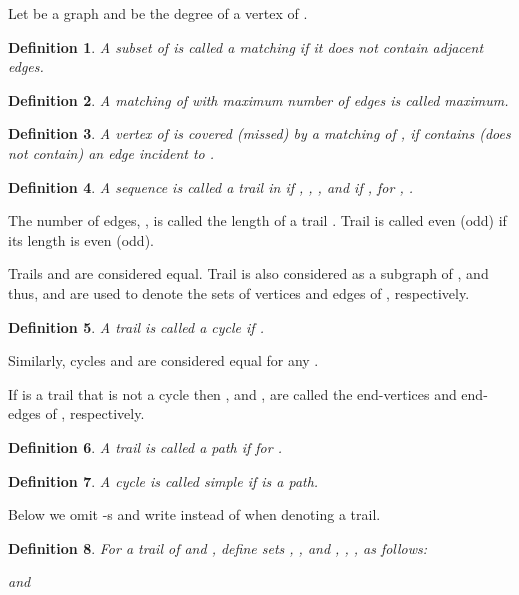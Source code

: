 \documentclass[a4paper, 12pt]{article}
\newtheorem{definition}{Definition}[section]
\begin{document}
Let  be a graph and  be the degree of a vertex  of
.

\begin{definition}\label{matching_definition}
A subset of  is called a matching if it does not contain
adjacent edges.
\end{definition}

\begin{definition}\label{maximum_matching_definition}
A matching of  with maximum number of edges is called maximum.
\end{definition}

\begin{definition}\label{covered_missed_by_matching}
A vertex  of  is covered (missed) by a matching  of , if
 contains (does not contain) an edge incident to .
\end{definition}

\begin{definition}\label{trail_definition}
A sequence  is called a trail
in  if , , ,
and  if , for , .
\end{definition}

The number of edges, , is called the length of a trail . Trail is called even (odd) if its
length is even (odd).

Trails  and  are considered equal. Trail  is also
considered as a subgraph of , and thus,  and  are
used to denote the sets of vertices and edges of , respectively.

\begin{definition}\label{cycle_definition}
A trail  is called a cycle if
.
\end{definition}

Similarly, cycles  and  are considered equal for
any .

If  is a trail that is
not a cycle then ,  and ,  are called the
end-vertices and end-edges of , respectively.

\begin{definition}\label{path_definition}
A trail  is called a path if
 for .
\end{definition}

\begin{definition}\label{simple_cycle_definition}
A cycle  is called simple if
 is a path.
\end{definition}

Below we omit -s and write  instead of
 when denoting a trail.

\begin{definition}\label{end_edges_and_vertices}
For a trail  of  and , define
sets , ,  and , ,
,  as follows:



and




\end{definition}
\end{document}
